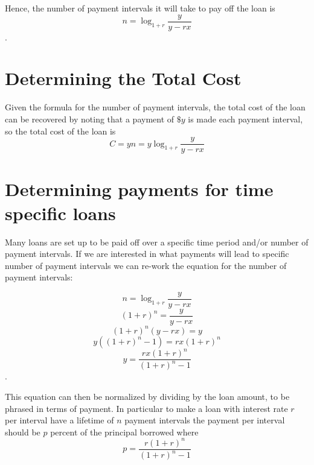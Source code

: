 \documentclass[11pt]{article} %
\begin{document}
Hence, the number of payment intervals it will take to pay off the loan is $$n = \log_{1+r} \frac{y}{y - rx}$$.

\section{Determining the Total Cost}
Given the formula for the number of payment intervals, the total cost of the loan can be recovered by noting that a payment of $\$y$ is made each payment interval, so the total cost of the loan is
$$C = yn = y\log_{1+r} \frac{y}{y - rx}$$

\section{Determining payments for time specific loans}
Many loans are set up to be paid off over a specific time period and/or number of payment intervals. If we are interested in what payments will lead to specific number of payment intervals we can re-work the equation for the number of payment intervals:

$$n = \log_{1+r} \frac{y}{y - rx}$$
$$(1+r)^{n} = \frac{y}{y-rx}$$
$$(1+r)^{n}(y-rx) = y$$
$$y( (1+r)^{n} - 1) = rx(1+r)^{n}$$
$$y = \frac{rx(1+r)^{n}}{(1+r)^{n} - 1}$$.

This equation can then be normalized by dividing by the loan amount, to be phrased in terms of payment.  In particular to make a loan with interest rate $r$ per interval have a lifetime of $n$ payment intervals the payment per interval should be $p$ percent of the principal borrowed where 
$$p = \frac{r(1+r)^{n}}{(1+r)^{n} - 1}$$
\end{document}
